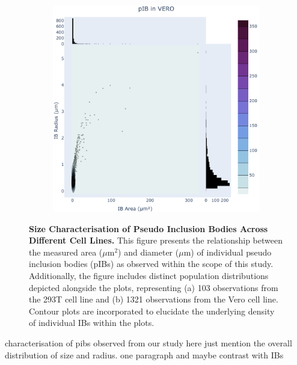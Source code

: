 \begin{figure}
\begin{subfigure}{0.495\textwidth}
        \includegraphics[width=\textwidth]{09. Chapter 4/Figs/01. pIB/01. pIB characterisation/02. heatmap_pib-vero.pdf}
    \end{subfigure}
    \caption[Size Characterisation of Pseudo Inclusion Bodies Across Different Cell Lines.]{\textbf{Size Characterisation of Pseudo Inclusion Bodies Across Different Cell Lines.} This figure presents the relationship between the measured area (\(\mu \mbox{m}^2\)) and diameter (\(\mu \mbox{m}\)) of individual pseudo inclusion bodies (pIBs) as observed within the scope of this study. Additionally, the figure includes distinct population distributions depicted alongside the plots, representing (a) 103 observations from the 293T cell line and (b) 1321 observations from the Vero cell line. Contour plots are incorporated to elucidate the underlying density of individual IBs within the plots.}
    \label{fig:Size Characterisation of Pseudo Inclusion Bodies Across Different Cell Lines}
\end{figure}

characterisation of pibs observed from our study
here just mention the overall distribution of size and radius. one paragraph and maybe contrast with IBs

